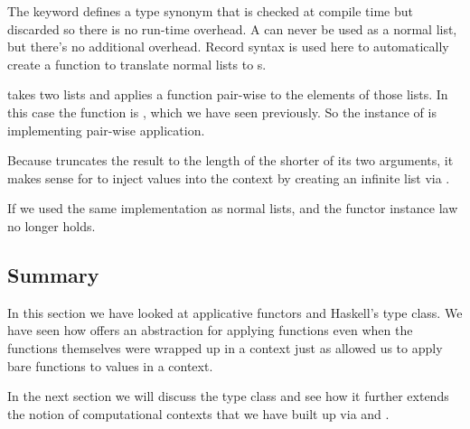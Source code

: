 \begin{notelist}
    \item The  keyword defines a type synonym that is checked at compile time but discarded so there is no
          run-time overhead. A  can never be used as a normal list, but there's no additional overhead.
          Record syntax is used here to automatically create a function  to translate normal lists to
          s.
    
    \item {} takes two lists and applies a function pair-wise to the elements of those lists. In this case
          the function is \code{(\$)}, which we have seen previously. So the  instance of 
          is implementing pair-wise application.

    \item Because  truncates the result to the length of the shorter of its two arguments, it makes sense
          for  to inject values into the  context by creating an infinite list via .

    \item If we used the same  implementation as normal lists,  and the functor
          instance law no longer holds.
\end{notelist}

\subsection{Summary}

In this section we have looked at applicative functors and Haskell's  type class. We have seen how
 offers an abstraction for applying functions even when the functions themselves were wrapped up in
a context just as  allowed us to apply bare functions to values in a context.

In the next section we will discuss the  type class and see how it further extends the notion of computational
contexts that we have built up via  and .

